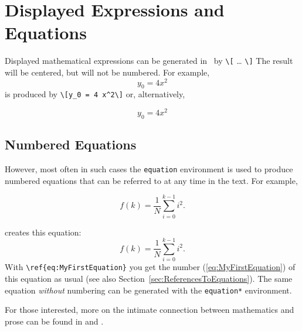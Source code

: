 \section{Displayed Expressions and Equations}

Displayed mathematical expressions can be generated in \latex\ by \verb!\[! \ldots 
\verb!\]! The result will be centered, but will not be numbered.
For example, \[y_0 = 4 x^2\] is produced by \verb!\[y_0 = 4 x^2\]!
or, alternatively,
%
\begin{LaTeXCode}[numbers=none]
\begin{displaymath} y_0 = 4 x^2 \end{displaymath}
\end{LaTeXCode}



\subsection{Numbered Equations}

However, most often in such cases the \texttt{equation} environment is used
to produce numbered equations that can be referred to at any time in the text.
For example, 
%
\begin{LaTeXCode}[numbers=none]
\begin{equation}
	f(k) = \frac{1}{N} \sum_{i=0}^{k-1} i^2 .
	\label{eq:MyFirstEquation}
\end{equation}
\end{LaTeXCode}
%
creates this equation:
%
\begin{equation}
	f(k) = \frac{1}{N} \sum_{i=0}^{k-1} i^2 .
	\label{eq:MyFirstEquation}
\end{equation}
%
With \verb|\ref{eq:MyFirstEquation}| you get the number (\ref{eq:MyFirstEquation})
of this equation as usual (see also Section~\ref{sec:ReferencesToEquations}).
The same equation \emph{without} numbering can be generated with the \texttt{equation*}
environment.
%
\begin{center}
	\setlength{\fboxrule}{0.2mm}
	\setlength{\fboxsep}{2mm}
\end{center}
%
For those interested, more on the intimate connection between mathematics and prose can
be found in \cite{Mermin1989} and \cite{Higham2020}.


